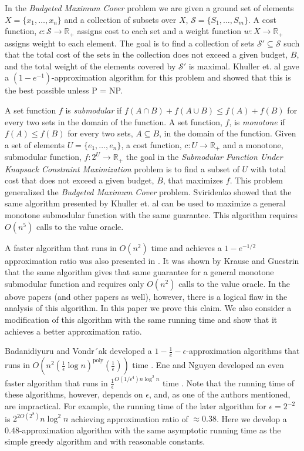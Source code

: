 In the \emph{Budgeted Maximum Cover} problem we are given a ground set of elements
$X = \{x_1, \dots, x_n\}$ and a collection of subsets over $X$,
$\mathcal{S} = \{S_1, \dots, S_m\}$.
A cost function, $c:\mathcal{S} \to \mathbb{R}_+$ assigns cost to each set
and a weight function $w:X \to \mathbb{R}_+$ assigns weight to each element.
The goal is to find a collection of sets $\mathcal{S'} \subseteq \mathcal{S}$ 
such that the total cost of the sets in the collection does not exceed a given budget, 
$B$, and the
total weight of the elements covered by $\mathcal{S'}$ is maximal.
Khuller et. al \cite{khuller1999budgeted}
gave a $(1-e^{-1})$-approximation algorithm for this problem and showed that this
is the best possible unless P = NP.

A set function $f$ is \emph{submodular} if $f(A \cap B) + f(A \cup B) \leq f(A) + f(B)$
for every two sets in the domain of the function. A set function, $f$, 
is \emph{monotone} if
$f(A) \leq f(B)$ for every two sets, $A \subseteq B$, in the domain of the function.
Given a set of elements $U = \{e_1, \dots, e_n\}$, a cost function,
$c:U \to \mathbb{R}_+$ and a monotone, submodular function, $f:2^U \to \mathbb{R}_+$
the goal in the 
\emph{Submodular Function Under Knapsack Constraint Maximization} 
problem is to find a subset of $U$ with total cost that does not exceed
a given budget, $B$, that maximizes $f$.
This problem generalized the \emph{Budgeted Maximum Cover} problem.
Sviridenko \cite{sviridenko2004note} showed that the same algorithm presented by
Khuller et. al can be used to maximize a general monotone submodular function
with the same guarantee.
This algorithm requires $O(n^5)$ calls to the value oracle.

A faster algorithm that runs in $O(n^2)$ time and achieves a $1 - e^{-1/2}$ approximation ratio
was also presented in \cite{khuller1999budgeted}.
It was shown by Krause and Guestrin \cite{krause2005note} that the same algorithm
gives that same guarantee for a general monotone submodular function and requires only
$O(n^2)$ calls to the value oracle.
In the above papers (and other papers as well), however,
there is a logical flaw in the analysis of this algorithm.
In this paper we prove this claim.
We also consider a modification of this algorithm with the same running time and show that it
achieves a better approximation ratio.

Badanidiyuru and Vondr´ak developed a $1 - \frac{1}{e} - \epsilon$-approximation 
algorithms that runs in 
$O(n^2(\frac{1}{\epsilon}\log n)^\text{poly}(\frac{1}{\epsilon}))$ time 
\cite{badanidiyuru2014fast}.
Ene and Nguyen developed an even faster algorithm that runs in 
$\frac{1}{\epsilon}^{O(1/\epsilon^4)n \log^2 n}$ time
\cite{Alina2017}.
Note that the running time of these algorithms, however, depends on $\epsilon$, and,
as one of the authors mentioned, are impractical.
For example, the running time of the later algorithm for $\epsilon = 2^{-2}$ is
$2^{2O(2^{8})}n\log^2n$ achieving approximation ratio of $\approx 0.38$.
Here we develop a $0.48$-approximation algorithm with the same
asymptotic running time as the simple greedy algorithm and with reasonable constants.
